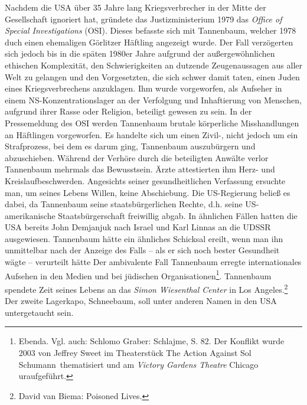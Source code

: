 \documentclass[a4paper,12pt,ngerman,
]{nisebook}
\begin{document}
Nachdem die USA über 35 Jahre lang Kriegsverbrecher in der Mitte der Gesellschaft ignoriert hat, gründete das Justizministerium 1979 das \emph{Office of Special Investigations} (OSI). Dieses befasste sich mit Tannenbaum, welcher 1978 duch einen ehemaligen Görlitzer Häftling angezeigt wurde. Der Fall verzögerten sich jedoch bis in die späten 1980er Jahre aufgrund der außergewöhnlichen ethischen Komplexität, den Schwierigkeiten an dutzende Zeugenaussagen aus aller Welt zu gelangen und den Vorgesetzten, die sich schwer damit taten, einen Juden eines Kriegsverbrechens anzuklagen. Ihm wurde vorgeworfen, als Aufseher in einem NS-Konzentrationslager an der Verfolgung und Inhaftierung von Menschen, aufgrund ihrer Rasse oder Religion, beteiligt gewesen zu sein. In der Pressemeldung des OSI werden Tannenbaum brutale körperliche Misshandlungen an Häftlingen vorgeworfen. Es handelte sich um einen Zivil-, nicht jedoch um ein Strafprozess, bei dem es darum ging, Tannenbaum auszubürgern und abzuschieben. Während der Verhöre durch die beteiligten Anwälte verlor Tannenbaum mehrmals das Bewusstsein. Ärzte attestierten ihm Herz- und Kreislaufbeschwerden. Angesichts seiner gesundheitlichen Verfassung ersuchte man, um seines Lebens Willen, keine Abschiebung. Die US-Regierung beließ es dabei, da Tannenbaum seine staatsbürgerlichen Rechte, d.h. seine US-amerikanische Staatsbürgerschaft freiwillig abgab. In ähnlichen Fällen hatten die USA bereits John Demjanjuk nach Israel und Karl Linnas an die UDSSR ausgewiesen. Tannenbaum hätte ein ähnliches Schicksal ereilt, wenn man ihn unmittelbar nach der Anzeige des Falls -- als er sich noch bester Gesundheit wägte --  verurteilt hätte
Der ambivalente Fall Tannenbaum erregte internationales Aufsehen in den Medien und bei jüdischen Organisationen\footnote{Ebenda. Vgl. auch: Schlomo Graber: Schlajme, S. 82. Der Konflikt wurde 2003 von Jeffrey Sweet im Theaterstück \glqq The Action Against Sol Schumann\grqq~thematisiert und am \emph{Victory Gardens Theatre} Chicago uraufgeführt.}. Tannenbaum spendete Zeit seines Lebens an das \emph{Simon Wiesenthal Center} in Los Angeles.\footnote{﻿David van Biema: Poisoned Lives.} 
~\newline
Der zweite Lagerkapo, Schneebaum, soll unter anderen Namen in den USA untergetaucht sein.
\end{document}
